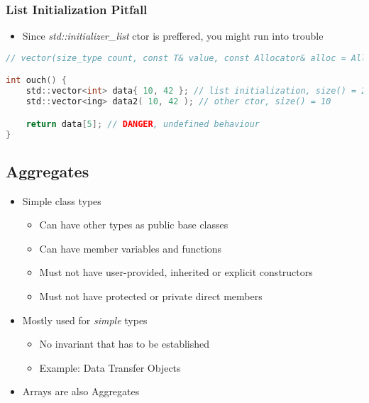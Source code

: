 \subsubsection{List Initialization Pitfall}
\begin{itemize}
    \item Since \textit{std::initializer\_list} ctor is preffered, you might run into trouble
\end{itemize}

\begin{lstlisting}[style=frame, style= linenumbers, language=C]
// vector(size_type count, const T& value, const Allocator& alloc = Allocator());

int ouch() {
    std::vector<int> data{ 10, 42 }; // list initialization, size() = 2
    std::vector<ing> data2( 10, 42 ); // other ctor, size() = 10

    return data[5]; // DANGER, undefined behaviour
}
\end{lstlisting}

\pagebreak

\subsection{Aggregates}
\begin{itemize}
    \item Simple class types
    \begin{itemize}
        \item Can have other types as public base classes
        \item Can have member variables and functions
        \item Must not have user-provided, inherited or explicit constructors
        \item Must not have protected or private direct members
    \end{itemize}
    \item Mostly used for \textit{simple} types
    \begin{itemize}
        \item No invariant that has to be established
        \item Example: Data Transfer Objects
    \end{itemize}
    \item Arrays are also Aggregates
\end{itemize}

